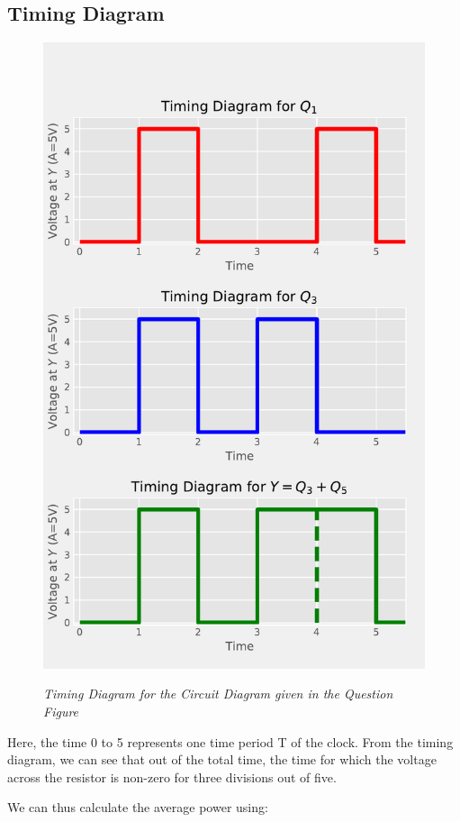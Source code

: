 \documentclass[table,xcdraw]{article}
\begin{document}
\subsection{Timing Diagram}
\begin{figure}[H]
    \centering
    \scalebox{0.68} {
    \includegraphics{figs/graph.pdf} }
    \caption{\textit{Timing Diagram for the Circuit Diagram given in the Question Figure}}
    \label{fig:graph}
\end{figure}

Here, the time 0 to 5 represents one time period T of the clock. 
From the timing diagram, we can see that out of the total time, the time for which the voltage across the resistor is non-zero for three divisions out of five.\par
We can thus calculate the average power using:
\end{document}
